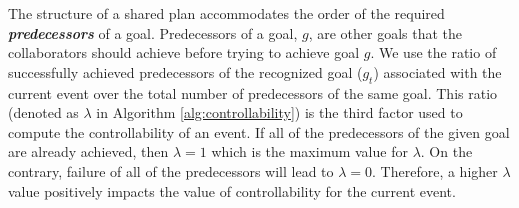 % 

The structure of a shared plan accommodates the order of the required
\textit{\textbf{predecessors}} of a goal. Predecessors of a goal, $g$, are other
goals that the collaborators should achieve before trying to achieve goal $g$.
We use the ratio of successfully achieved predecessors of the recognized goal
($\mathit{g}_{t}$) associated with the current event over the total number of
predecessors of the same goal. This ratio (denoted as $\lambda$ in Algorithm
\ref{alg:controllability}) is the third factor used to compute the
controllability of an event. If all of the predecessors of the given goal are
already achieved, then $\lambda=1$ which is the maximum value for $\lambda$. On
the contrary, failure of all of the predecessors will lead to $\lambda=0$.
Therefore, a higher $\lambda$ value positively impacts the value of
controllability for the current event.

% 

